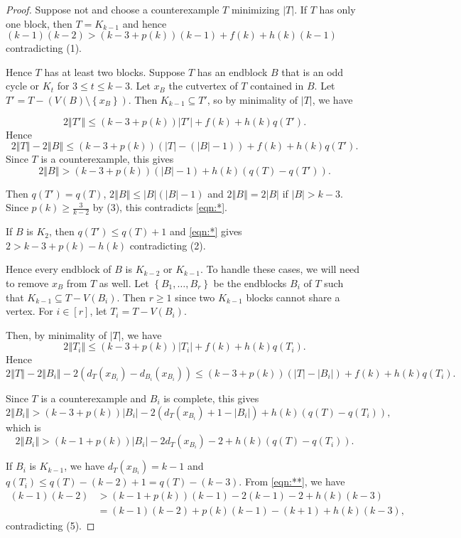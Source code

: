 \documentclass[12pt]{article}
\theoremstyle{plain}
\theoremstyle{definition}
\theoremstyle{remark}
\newcommand{\set}[1]{\left\{ #1 \right\}}
\newcommand{\card}[1]{\left|#1\right|}
\newcommand{\size}[1]{\left\Vert#1\right\Vert}
\newcommand{\irange}[1]{\left[#1\right]}
\newcommand{\parens}[1]{\left( #1 \right)}
\begin{document}
\begin{proof}
	Suppose not and choose a counterexample $T$ minimizing $|T|$.  If $T$ has only one block, then $T=K_{k-1}$ and hence $(k-1)(k-2) > (k-3 + p(k))(k-1) + f(k) + h(k)(k-1)$ contradicting (1). 
	
	Hence $T$ has at least two blocks.  Suppose $T$ has an endblock $B$ that is an odd cycle or $K_t$ for $3 \le t \le k-3$. Let $x_B$ the cutvertex of $T$ contained in $B$. 
	Let $T' = T - \parens{V(B) \setminus \set{x_B}}$. Then $K_{k-1} \subseteq T'$, so by minimality of $|T|$, we have
	
	\[2\size{T'} \le (k-3 + p(k))\card{T'} + f(k) + h(k)q(T').\]
	Hence
	\[2\size{T} - 2\size{B} \le (k-3 + p(k))\parens{\card{T} - (\card{B} - 1)} + f(k) + h(k)q(T').\]
	Since $T$ is a counterexample, this gives
	\begin{equation}
		2\size{B} > (k-3 + p(k))(\card{B} - 1) + h(k)\parens{q(T) - q(T')}.\tag{*}\label{eqn:*}
	\end{equation}
	
	Then $q(T') = q(T)$, $2\size{B} \le \card{B}(\card{B}-1)$ and $2\size{B} = 2\card{B}$ if $\card{B} > k-3$.  Since $p(k) \ge \frac{3}{k-2}$ by (3), this contradicts \ref{eqn:*}.
	
	If $B$ is $K_2$, then $q(T') \le q(T) + 1$ and \ref{eqn:*} gives $2 > k-3 + p(k) - h(k)$ contradicting (2).
	
	Hence every endblock of $B$ is $K_{k-2}$ or $K_{k-1}$. To handle these cases, we will need to remove $x_B$ from $T$ as well.  Let $\set{B_1, \ldots, B_r}$ be the endblocks $B_i$ of $T$ such that $K_{k-1} \subseteq T - V(B_i)$.
	Then $r \ge 1$ since two $K_{k-1}$ blocks cannot share a vertex.  For $i \in \irange{r}$, let $T_i = T - V(B_i)$. 
	
	Then, by minimality of $|T|$, we have
	\[2\size{T_i} \le (k-3 + p(k))\card{T_i} + f(k) + h(k)q(T_i).\]
	Hence
	\[2\size{T} - 2\size{B_i} - 2(d_T(x_{B_i}) - d_{B_i}(x_{B_i})) \le (k-3 + p(k))\parens{\card{T} - \card{B_i}} + f(k) + h(k)q(T_i).\]
	
	Since $T$ is a counterexample and $B_i$ is complete, this gives
	\[2\size{B_i} > (k-3 + p(k))\card{B_i} -2(d_T(x_{B_i}) + 1 - \card{B_i}) + h(k)\parens{q(T) - q(T_i)},\]
	which is
	\begin{equation}
		2\size{B_i} > (k-1 + p(k))\card{B_i} - 2d_T(x_{B_i}) - 2 + h(k)\parens{q(T) - q(T_i)}.\tag{**}\label{eqn:**}
	\end{equation}
	
	If $B_i$ is $K_{k-1}$, we have $d_T(x_{B_i}) = k - 1$ and $q(T_i) \le q(T) - (k-2) + 1 = q(T) - (k-3)$.  From \ref{eqn:**}, we have
	\begin{align*}
		(k-1)(k-2) &> (k-1 + p(k))(k-1) - 2(k-1) - 2 + h(k)(k-3)\\
		&= (k-1)(k-2) + p(k)(k-1) - (k+1) + h(k)(k-3),
	\end{align*}
	contradicting (5).
	

\end{proof}
\end{document}
